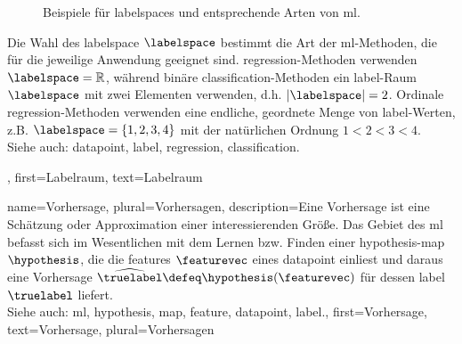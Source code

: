 {{{{{{\begin{figure}[H]
		\caption{\label{fig_label_spaces_dict} Beispiele für \glspl{labelspace} und entsprechende Arten von \gls{ml}.}
		\end{figure}
		Die Wahl des \gls{labelspace} $\labelspace$ bestimmt die Art der \gls{ml}-Methoden, 
		die für die jeweilige Anwendung geeignet sind. \Gls{regression}-Methoden verwenden 
		$\labelspace = \mathbb{R}$, während binäre \gls{classification}-Methoden ein \gls{label}-Raum 
		$\labelspace$ mit zwei Elementen verwenden, d.h. $|\labelspace|=2$. Ordinale \gls{regression}-Methoden 
		verwenden eine endliche, geordnete Menge von \gls{label}-Werten, z.B. 
		$\labelspace = \{1,2,3,4\}$ mit der natürlichen Ordnung $1 < 2 < 3 < 4$.
					\\ 
		Siehe auch:  \gls{datapoint}, \gls{label}, \gls{regression}, \gls{classification}.}, 
	first={Labelraum},
	text={Labelraum}  
}

{name={Vorhersage}, plural={Vorhersagen},
	description={Eine Vorhersage ist eine Schätzung oder Approximation einer interessierenden Größe. 
		Das Gebiet des \gls{ml} befasst sich im Wesentlichen mit dem Lernen bzw. Finden einer \gls{hypothesis}-\gls{map} $\hypothesis$, 
		die die \glspl{feature} $\featurevec$ eines \gls{datapoint} einliest und daraus eine Vorhersage 
		$\widehat{\truelabel} \defeq \hypothesis(\featurevec)$ für dessen \gls{label} $\truelabel$ liefert.
					\\ 
		Siehe auch: \gls{ml}, \gls{hypothesis}, \gls{map}, \gls{feature}, \gls{datapoint}, \gls{label}.},
	first={Vorhersage},
	text={Vorhersage},
	plural={Vorhersagen}  
}

}}}}
